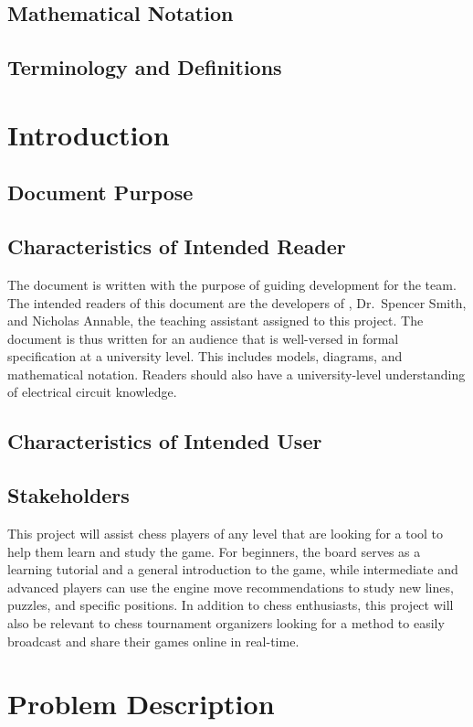 \documentclass[12pt]{article}
\begin{document}
\subsection{Mathematical Notation}

\subsection{Terminology and  Definitions}

\section{Introduction}
\subsection{Document Purpose}
\subsection{Characteristics of Intended Reader}
{The document is written with the purpose of guiding development for the \progname{} team. The intended readers of this document 
are the developers of \progname{}, Dr.~Spencer Smith, and Nicholas Annable, the teaching assistant assigned to this project. The 
document is thus written for an audience that is well-versed in formal specification at a university level. This includes models, 
diagrams, and mathematical notation. Readers should also have a university-level understanding of electrical circuit knowledge.}

\subsection{Characteristics of Intended User}
\subsection{Stakeholders}
{This project will assist chess players of any level that are looking for a tool to help them learn and study the game. For beginners, 
the board serves as a learning tutorial and a general introduction to the game, while intermediate and advanced players can use the 
engine move recommendations to study new lines, puzzles, and specific positions. In addition to chess enthusiasts, this project will 
also be relevant to chess tournament organizers looking for a method to easily broadcast and share their games online in real-time. }

\section{Problem Description}
\end{document}
